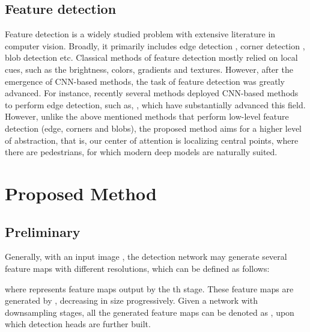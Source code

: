 \documentclass[review]{elsarticle}
\begin{document}
\subsection{Feature detection}

Feature detection is a widely studied problem with extensive literature in computer vision. Broadly, it primarily includes edge detection \cite{canny1986computational,sobel1972camera}, corner detection \cite{rosten2006machine,rosten2010faster}, blob detection \cite{matas2004robust,deng2007principal} etc. Classical methods \cite{canny1986computational,sobel1972camera} of feature detection mostly relied on local cues, such as the brightness, colors, gradients and textures. However, after the emergence of CNN-based methods, the task of feature detection was greatly advanced. For instance, recently several methods deployed CNN-based methods to perform edge detection, such as, \cite{shen2015deepcontour,xie2017holistically,bertasius2015deepedge,liu2017richer}, which have substantially advanced this field. However, unlike the above mentioned methods that perform low-level feature detection (edge, corners and blobs), the proposed method aims for a higher level of abstraction, that is, our center of attention is localizing central points, where there are pedestrians, for which modern deep models are naturally suited. 

















\section{Proposed Method}
\subsection{Preliminary}
Generally, with an input image , the detection network may generate several feature maps with different resolutions, which can be defined as follows:

where  represents feature maps output by the th stage. These feature maps are generated by , decreasing in size progressively. Given a network with  downsampling stages, all the generated feature maps can be denoted as , upon which detection heads are further built.
\end{document}

